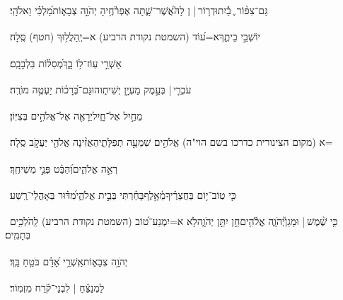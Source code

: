 \documentclass[12pt]{article}
\newcommand{\loc}[1]{\textsuperscript{\locf{#1}}}
\begin{document}
{\loc{ ד}~}‏גַּם־צִפּ֨וֹר ֪ בַ֡יִת{\hfill}וּדְר֤וֹר |  {\Large }ן לָהּ֮\newline\hspace*{.5em}אֲשֶׁר־שָׁ֢תָה אֶפְרֹ֫חֶ֥יהָ{\hfill} יְהֹוָ֣ה צְבָא֑וֹת\newline\hspace*{.5em}מַ֝לְכִּ֗י וֵאלֹהָֽי׃\par

{\loc{ ה}~}‏ יוֹשְׁבֵ֣י בֵיתֶ֑ךָ{\hfill}א=ע֝וֹד (השמטת נקודת הרביע) א=יְֽהַלֲל֥וּךָ (חטף) סֶּֽלָה׃\par

{\loc{ ו}~}‏אַשְׁרֵ֣י  עֽוֹז־ל֥וֹ בָ֑ךְ{\hfill}מְ֝סִלּ֗וֹת בִּלְבָבָֽם׃\par

{\loc{ ז}~}‏עֹבְרֵ֤י |  בְּעֵ֣מֶק  מַעְיָ֣ן יְשִׁית֑וּהוּ{\hfill}גַּם־בְּ֝רָכ֗וֹת יַעְטֶ֥ה מוֹרֶֽה׃\par

{\loc{ ח}~}‏ מֵחַ֣יִל אֶל־חָ֑יִל{\hfill}יֵרָאֶ֖ה אֶל־אֱלֹהִ֣ים בְּצִיּֽוֹן׃\par

{\loc{ ט}~}‏=א (מקום הצינורית כדרכו בשם הוי"ה) אֱלֹהִ֣ים  שִׁמְעָ֣ה תְפִלָּתִ֑י{\hfill}הַאֲזִ֨ינָה אֱלֹהֵ֖י יַעֲקֹ֣ב סֶֽלָה׃\par

{\loc{ י}~}‏ רְאֵ֣ה אֱלֹהִ֑ים{\hfill}וְ֝הַבֵּ֗ט פְּנֵ֣י מְשִׁיחֶֽךָ׃\par

{\loc{ יא}~}‏כִּ֤י טֽוֹב־י֥וֹם בַּחֲצֵרֶ֗יךָ{\hfill}מֵ֫אָ֥לֶף\newline\hspace*{.5em}בָּחַ֗רְתִּי  בְּבֵ֣ית אֱלֹהַ֑י{\hfill}מִ֝דּ֗וּר בְּאָהֳלֵי־רֶֽשַׁע׃\par

{\loc{ יב}~}‏כִּ֤י שֶׁ֨מֶשׁ |  וּמָגֵן֮{\hfill}יְהֹוָ֢ה אֱלֹ֫הִ֥ים\newline\hspace*{.5em}חֵ֣ן  יִתֵּ֣ן יְהֹוָ֑ה{\hfill}לֹ֥א א=יִמְנַע־ט֝וֹב (השמטת נקודת הרביע) לַֽהֹלְכִ֥ים בְּתָמִֽים׃\par

{\loc{ יג}~}‏יְהֹוָ֥ה צְבָא֑וֹת{\hfill}אַֽשְׁרֵ֥י אָ֝דָ֗ם בֹּטֵ֥חַ בָּֽךְ׃\par\pend
\ledpb
\pstart[\subsection*{\textcolor{red}{פרק פה}}]\label{פרק פה}
{\loc{ א}~}‏לַמְנַצֵּ֬חַ | לִבְנֵי־קֹ֬רַח מִזְמֽוֹר׃\par
\end{document}
